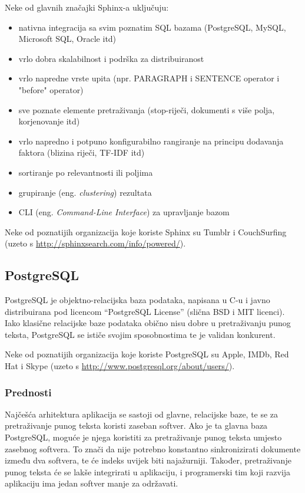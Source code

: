 \documentclass[a4paper,twoside,12pt]{scrreprt}
\begin{document}
Neke od glavnih značajki Sphinx-a uključuju:

\begin{itemize}
  \item nativna integracija sa svim poznatim SQL bazama (PostgreSQL, MySQL, Microsoft SQL, Oracle itd)
  \item vrlo dobra skalabilnost i podrška za distribuiranost
  \item vrlo napredne vrste upita (npr. PARAGRAPH i SENTENCE operator i "before" operator)
  \item sve poznate elemente pretraživanja (stop-riječi, dokumenti s više polja, korjenovanje itd)
  \item vrlo napredno i potpuno konfigurabilno rangiranje na principu dodavanja faktora (blizina riječi, TF-IDF itd)
  \item sortiranje po relevantnosti ili poljima
  \item grupiranje (eng. \textit{clustering}) rezultata
  \item CLI (eng. \textit{Command-Line Interface}) za upravljanje bazom
\end{itemize}

Neke od poznatijih organizacija koje koriste Sphinx su Tumblr i CouchSurfing (uzeto s \url{http://sphinxsearch.com/info/powered/}).

\subsection{PostgreSQL}

PostgreSQL je objektno-relacijska baza podataka, napisana u C-u i javno distribuirana pod licencom ``PostgreSQL License'' (slična BSD i MIT licenci). Iako klasične relacijske baze podataka obično nisu dobre u pretraživanju punog teksta, PostgreSQL se ističe svojim sposobnostima te je validan konkurent.

Neke od poznatijih organizacija koje koriste PostgreSQL su Apple, IMDb, Red Hat i Skype (uzeto s \url{http://www.postgresql.org/about/users/}).

\subsubsection{Prednosti}

Najčešća arhitektura aplikacija se sastoji od glavne, relacijske baze, te se za pretraživanje punog teksta koristi zaseban softver. Ako je ta glavna baza PostgreSQL, moguće je njega koristiti za pretraživanje punog teksta umjesto zasebnog softvera. To znači da nije potrebno konstantno sinkronizirati dokumente između dva softvera, te će indeks uvijek biti najažurniji. Također, pretraživanje punog teksta će se lakše integrirati u aplikaciju, i programerski tim koji razvija aplikaciju ima jedan softver manje za održavati.
\end{document}
